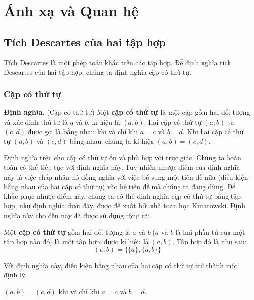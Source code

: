 \chapter{Ánh xạ và Quan hệ}\label{chapter:relations-and-mappings}

\section{Tích Descartes của hai tập hợp}

Tích Descartes là một phép toán khác trên các tập hợp. Để định nghĩa tích Descartes của hai tập hợp, chúng ta định nghĩa cặp có thứ tự.

\subsection{Cặp có thứ tự}

\noindent\textbf{Định nghĩa.} (Cặp có thứ tự) Một \textbf{cặp có thứ tự} là một cặp gồm hai đối tượng và xác định thứ tự là $a$ và $b$, kí hiệu là $(a, b)$. Hai cặp có thứ tự $(a, b)$ và $(c, d)$ được gọi là bằng nhau khi và chỉ khi $a = c$ và $b = d$. Khi hai cặp có thứ tự $(a, b)$ và $(c, d)$ bằng nhau, chúng ta kí hiệu $(a, b) = (c, d)$.

\bigskip

Định nghĩa trên cho cặp có thứ tự ổn và phù hợp với trực giác. Chúng ta hoàn toàn có thể tiếp tục với định nghĩa này. Tuy nhiên nhược điểm của định nghĩa này là việc chấp nhận nó đồng nghĩa với việc bổ sung một tiên đề nữa (điều kiện bằng nhau của hai cặp có thứ tự) vào hệ tiên đề mà chúng ta đang dùng. Để khắc phục nhược điểm này, chúng ta có thể định nghĩa cặp có thứ tự bằng tập hợp, như định nghĩa dưới đây, được đề xuất bởi nhà toán học Kuratowski. Định nghĩa này cho đến nay đã được sử dụng rộng rãi.

\begin{definition}
    Một \textbf{cặp có thứ tự} gồm hai đối tượng là $a$ và $b$ ($a$ và $b$ là hai phần tử của một tập hợp nào đó) là một tập hợp, được kí hiệu là $(a, b)$. Tập hợp đó là như sau:
    \[
        (a, b) = \{ \{ a \}, \{ a, b \} \}
    \]
\end{definition}

Với định nghĩa này, điều kiện bằng nhau của hai cặp có thứ tự trở thành một định lý.

\begin{theorem}
    $(a, b) = (c, d)$ khi và chỉ khi $a = c$ và $b = d$.
\end{theorem}

